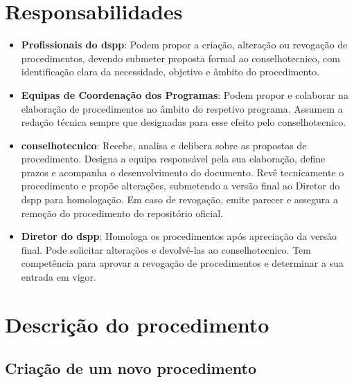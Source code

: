 \section{Responsabilidades}\label{sec:responsabilidades}

\begin{itemize}
    \item \textbf{Profissionais do \gls{dspp}}: Podem propor a criação, alteração ou revogação de procedimentos, devendo submeter proposta formal ao \gls{conselhotecnico}, com identificação clara da necessidade, objetivo e âmbito do procedimento.
    \item \textbf{Equipas de Coordenação dos Programas}: Podem propor e colaborar na elaboração de procedimentos no âmbito do respetivo programa. Assumem a redação técnica sempre que designadas para esse efeito pelo \gls{conselhotecnico}.
    \item \textbf{\gls{conselhotecnico}}: Recebe, analisa e delibera sobre as propostas de procedimento. Designa a equipa responsável pela sua elaboração, define prazos e acompanha o desenvolvimento do documento. Revê tecnicamente o procedimento e propõe alterações, submetendo a versão final ao Diretor do \gls{dspp} para homologação. Em caso de revogação, emite parecer e assegura a remoção do procedimento do repositório oficial.
    \item \textbf{Diretor do \gls{dspp}}: Homologa os procedimentos após apreciação da versão final. Pode solicitar alterações e devolvê-las ao \gls{conselhotecnico}. Tem competência para aprovar a revogação de procedimentos e determinar a sua entrada em vigor.
\end{itemize}


\section{Descrição do procedimento}\label{sec:descricao-do-procedimento}

\subsection{Criação de um novo procedimento}\label{sec:criacao-do-procedimento}

